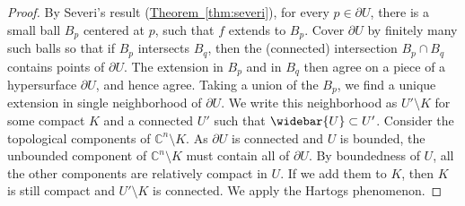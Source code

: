 \documentclass[12pt,openany]{book}
\newcommand{\C}{{\mathbb{C}}}
\theoremstyle{plain}
\theoremstyle{remark}
\theoremstyle{definition}
\theoremstyle{exercise}
\theoremstyle{example}
\newcommand{\thmref}[1]{\hyperref[#1]{Theorem~\ref*{#1}}}
\begin{document}
\begin{proof}
By Severi's result (\thmref{thm:severi}), for every $p \in \partial U$,
there is a small ball $B_p$ centered at $p$,
such that $f$ extends to $B_p$.  Cover $\partial
U$ by finitely many such balls so that if $B_p$ intersects $B_q$, then
the (connected) intersection $B_p \cap B_q$ contains points of $\partial U$.
The extension in $B_p$ and in $B_q$ then agree on a piece of a hypersurface
$\partial U$, and hence agree.  Taking a union of the $B_p$, we find
a unique extension in single neighborhood of $\partial U$.
We write this neighborhood as $U' \setminus K$ for some compact $K$
and a connected $U'$ such that $\widebar{U} \subset U'$.
Consider the topological components of $\C^n \setminus K$.  As
$\partial U$ is connected and $U$ is bounded,
the unbounded component of $\C^n \setminus K$ must contain all of $\partial U$.
By boundedness of $U$, all the other components are
relatively compact in $U$.  If we add them to $K$, then $K$
is still compact and $U' \setminus K$ is connected.
We apply the Hartogs phenomenon.
\end{proof}
\end{document}

